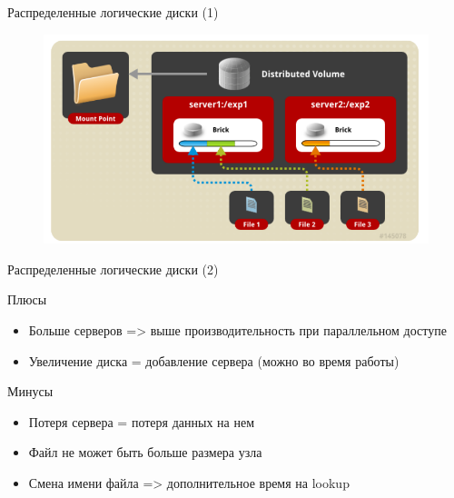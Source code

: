 \documentclass[sans]{beamer}
\begin{document}
\begin{frame}{Распределенные логические диски (1)}
	\begin{figure}[h]
		\centering
		\includegraphics[width=0.8\linewidth]{images/distributed.png}
	\end{figure}

\end{frame}

\begin{frame}{Распределенные логические диски (2)}
	\begin{block}{Плюсы}
		\begin{itemize}
			\item Больше серверов => выше производительность при параллельном доступе

			\item Увеличение диска = добавление сервера (можно во время работы) %
		\end{itemize}
	\end{block}
	\begin{block}{Минусы}
		\begin{itemize}
			\item Потеря сервера = потеря данных на нем
			\item Файл не может быть больше размера узла
			\item Смена имени файла => дополнительное время на lookup
		\end{itemize}
	\end{block}
\end{frame}
\end{document}
